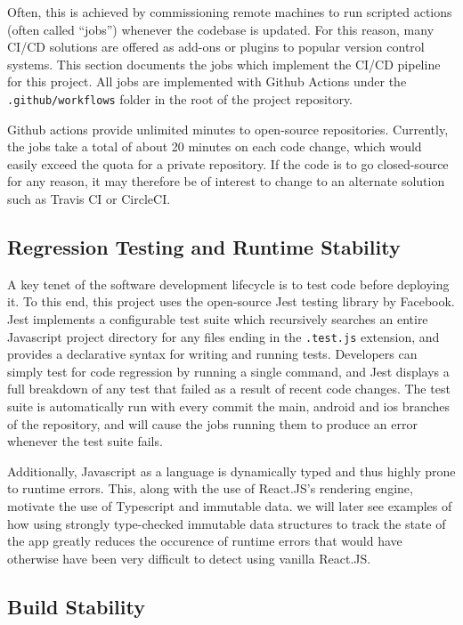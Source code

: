 Often, this is achieved by commissioning remote machines to run scripted actions (often called ``jobs'') whenever the codebase is updated. For this reason, many CI/CD solutions are offered as add-ons or plugins to popular version control systems. This section documents the jobs which implement the CI/CD pipeline for this project. All jobs are implemented with Github Actions under the \texttt{.github/workflows} folder in the root of the project repository.

Github actions provide unlimited minutes to open-source repositories. Currently, the jobs take a total of about 20 minutes on each code change, which would easily exceed the quota for a private repository. If the code is to go closed-source for any reason, it may therefore be of interest to change to an alternate solution such as Travis CI or CircleCI.

\subsection{Regression Testing and Runtime Stability}
A key tenet of the software development lifecycle is to test code before deploying it. To this end, this project uses the open-source Jest testing library by Facebook. Jest implements a configurable test suite which recursively searches an entire Javascript project directory for any files ending in the \texttt{.test.js} extension, and provides a declarative syntax for writing and running tests. Developers can simply test for code regression by running a single command, and Jest displays a full breakdown of any test that failed as a result of recent code changes. The test suite is automatically run with every commit the main, android and ios branches of the repository, and will cause the jobs running them to produce an error whenever the test suite fails.

Additionally, Javascript as a language is dynamically typed and thus highly prone to runtime errors. This, along with the use of React.JS's rendering engine, motivate the use of Typescript and immutable data. we will later see examples of how using strongly type-checked immutable data structures to track the state of the app greatly reduces the occurence of runtime errors that would have otherwise have been very difficult to detect using vanilla React.JS.

\subsection{Build Stability}

